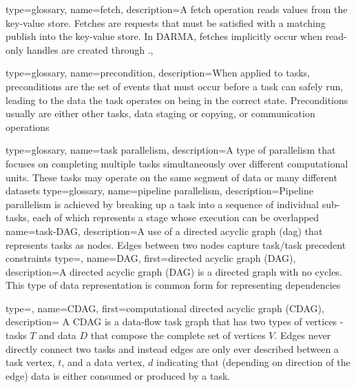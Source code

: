 {
  type=glossary,
  name={fetch},
  description={A fetch operation reads values from the key-value store. Fetches are requests that must be satisfied with a matching publish into the key-value store. In DARMA, fetches implicitly occur when read-only handles are created through .},
}

{
  type=glossary,
  name={precondition},
  description={When applied to tasks, preconditions are the set of events that must occur before a task can safely run,
    leading to the data the task operates on being in the correct state. Preconditions usually are either other tasks,
    data staging or copying, or communication operations}
}

{
  type=glossary,
  name={task parallelism},
  description={A type of parallelism that focuses on completing multiple tasks simultaneously over different computational units. These tasks may operate on the same segment of data or many different datasets}
}
{
  type=glossary,
  name={pipeline parallelism},
  description={Pipeline parallelism is achieved by breaking up a task into a sequence of
individual sub-tasks, each of which represents a stage whose execution can be
  overlapped}
}
{
  name={task-DAG},
  description={A use of a directed acyclic graph (\gls{dag}) that represents
    tasks as nodes. Edges between two nodes capture task/task precedent
      constraints}
}
{
  type=\acronymtype,
  name={DAG},
  first={directed acyclic graph (DAG)},
  description={A directed acyclic graph (DAG) is a directed graph with no cycles. This type of data representation is common form for representing dependencies}
}

{
  type=\acronymtype,
  name={CDAG},
  first={computational directed acyclic graph (CDAG)},
  description={ A CDAG is a data-flow task graph that has two
types of vertices - tasks $T$ and data $D$ that compose the complete set of vertices $V$.
Edges never directly connect two tasks and instead edges are only ever described between a task vertex, $t$, and a data vertex, $d$
indicating that (depending on direction of the edge) data is either consumed or produced by a task.
}
}


